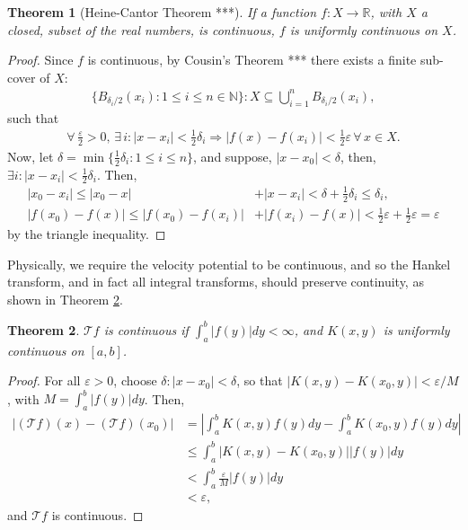 \documentclass[12pt]{article}
\newtheorem{theorem}{Theorem}[section]
\begin{document}
\begin{theorem}[Heine-Cantor Theorem ***]
If a function $f: X \rightarrow \mathbb{R}$, with $X$ a closed, subset of the real numbers, is continuous, $f$ is uniformly continuous on $X$.
\label{thm:uniform}
\end{theorem}
\begin{proof}
Since $f$ is continuous, by Cousin's Theorem *** there exists a finite sub-cover of $X$:
\begin{align*}
\{ B_{\delta_i/2} (x_i) : 1 \leq i \leq n \in \mathbb{N} \} : X \subseteq \bigcup_{i=1}^n B_{\delta_i/2}(x_i),
\end{align*}
such that
\begin{align*}
\forall \, \frac{\varepsilon}{2} > 0, \, \exists \, i : |x-x_i| < \frac{1}{2} \delta_i \Rightarrow |f(x)-f(x_i)| < \frac{1}{2}\varepsilon \, \forall \, x \in X.
\end{align*}
Now, let $\delta = \min \{ \frac{1}{2} \delta_i : 1 \leq i \leq n \}$, and suppose, $|x-x_0| < \delta$, then, $\exists i : |x-x_i| < \frac{1}{2}\delta_i$.  Then,
\begin{align*}
|x_0-x_i| \leq |x_0-x| &+ |x-x_i| < \delta + \frac{1}{2}\delta_i \leq \delta_i, \\
|f(x_0)-f(x)| \leq |f(x_0)-f(x_i)| &+ |f(x_i)-f(x)| < \frac{1}{2}\varepsilon + \frac{1}{2}\varepsilon = \varepsilon
\end{align*}
by the triangle inequality.
\end{proof}

Physically, we require the velocity potential to be continuous, and so the Hankel transform, and in fact all integral transforms, should preserve continuity, as shown in Theorem \ref{thm:continuity}.

\begin{theorem}
\label{thm:continuity}
$\mathcal{T}f$ is continuous if $\int_a^b |f(y)| dy < \infty$, and $K(x,y)$ is uniformly continuous on $[a,b]$.
\end{theorem}
\begin{proof}
For all $\varepsilon > 0$, choose $\delta : |x - x_0| < \delta$, so that $|K(x,y) - K(x_0,y)| < \varepsilon/M$, with $M = \int_a^b |f(y)| dy$. Then,
\begin{align*}
|(\mathcal{T}f)(x) - (\mathcal{T}f)(x_0)| &= \left| \int_a^b K(x,y)f(y) dy - \int_a^b K(x_0,y)f(y) dy \right| \\
&\leq \int_a^b |K(x,y) - K(x_0,y)||f(y)| dy \\
&< \int_a^b \frac{\varepsilon}{M} |f(y)| dy \\
&< \varepsilon,
\end{align*}
and $\mathcal{T}f$ is continuous.
\end{proof}
\end{document}
